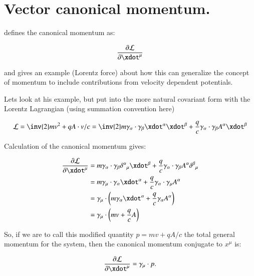 %
\chapter{Vector canonical momentum.}\label{chap:PJCanMomentum}

\cite{goldstein1951cm} defines the canonical momentum as:

\begin{equation*}
\PD{\xdot^{\mu}}{\LL}
\end{equation*}

and gives an example (Lorentz force) about how this can generalize the
concept of momentum to include contributions from velocity dependent 
potentials.

Lets look at his example, but put into the more natural covariant form
with the Lorentz Lagrangian (using summation convention here)

\begin{equation*}
\LL = \inv{2} m v^2 + q A \cdot v /c = 
\inv{2} m \gamma_{\alpha} \cdot \gamma_{\beta} \xdot^{\alpha} \xdot^{\beta}
+ \frac{q}{c} \gamma_{\alpha} \cdot \gamma_{\beta} A^{\alpha} \xdot^{\beta}
\end{equation*}

Calculation of the canonical momentum gives:

\begin{align*}
\PD{\xdot^{\mu}}{\LL} 
&=
m \gamma_{\alpha} \cdot \gamma_{\beta} {\delta^{\alpha}}_{\mu} \xdot^{\beta}
+ \frac{q}{c} \gamma_{\alpha} \cdot \gamma_{\beta} A^{\alpha} {\delta^{\beta}}_{\mu} \\
&=
m \gamma_{\mu} \cdot \gamma_{\alpha} \xdot^{\alpha}
+ \frac{q}{c} \gamma_{\alpha} \cdot \gamma_{\mu} A^{\alpha} \\
&=
\gamma_{\mu} \cdot \left( 
m \gamma_{\alpha} \xdot^{\alpha}
+ \frac{q}{c} \gamma_{\alpha} A^{\alpha}
\right) \\
&= \gamma_{\mu} \cdot \left( m v + \frac{q}{c} A \right) \\
\end{align*}

So, if we are to call this modified quantity $p = m v + q A / c$ the total general momentum for the system, then the canonical momentum conjugate to $x^{\mu}$ is:

\begin{equation*}
\PD{\xdot^{\mu}}{\LL} = \gamma_{\mu} \cdot p.
\end{equation*}

